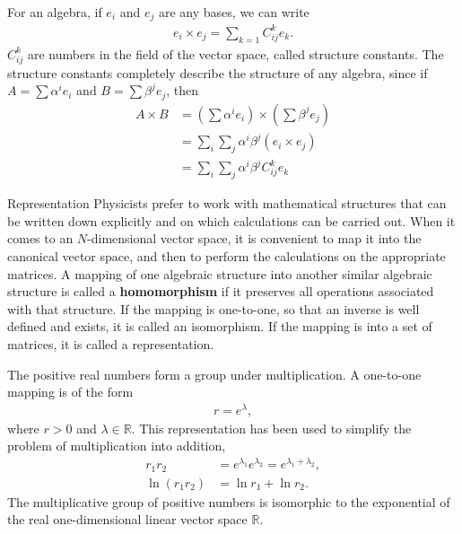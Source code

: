\documentclass{beamer}
\begin{document}
\begin{frame}
\justify
For an algebra, if $e_i$ and $e_j$ are any bases, we can write
\begin{align}
e_i \times e_j = \sum_{k=1} C_{ij}^k e_k.
\end{align}
$C_{ij}^k$ are numbers in the field of the vector space, called structure constants. The structure constants completely describe the structure of any algebra, since if $A = \sum \alpha^i e_i$ and $B = \sum \beta^j e_j$, then
\begin{align*}
A \times B & = (\sum \alpha^i e_i) \times (\sum \beta^j e_j) \\
& = \sum_i \sum_j \alpha^i \beta^j (e_i \times e_j) \\
& = \sum_i \sum_j \alpha^i \beta^j C_{ij}^k e_k
\end{align*}
\end{frame}

\begin{frame}{Representation}
\justify
Physicists prefer to work with mathematical structures that can be written down explicitly and on which calculations can be carried out.
\vfill
When it comes to an $N$-dimensional vector space, it is convenient to map it into the canonical vector space, and then to perform the calculations on the appropriate matrices.
\vfill
A mapping of one algebraic structure into another similar algebraic structure is called a \textbf{homomorphism} if it preserves all operations associated with that structure.
\vfill
If the mapping is one-to-one, so that an inverse is well defined and exists, it is called an isomorphism.
\vfill
If the mapping is into a set of matrices, it is called a representation.
\end{frame}

\begin{frame}
\justify
The positive real numbers form a group under multiplication. A one-to-one mapping is of the form
\begin{align}
r = e^\lambda,
\end{align}
where $r>0$ and $\lambda \in \mathbb{R}$.
\vfill
This representation has been used to simplify the problem of multiplication into addition,
\begin{align}
r_1 r_2 & = e^{\lambda_1} e^{\lambda_2} = e^{\lambda_1 + \lambda_2}, \\
\ln (r_1 r_2) & = \ln r_1 + \ln r_2.
\end{align}
\vfill
The multiplicative group of positive numbers is isomorphic to the exponential of the real one-dimensional linear vector space $\mathbb{R}$.
\end{frame}
\end{document}
